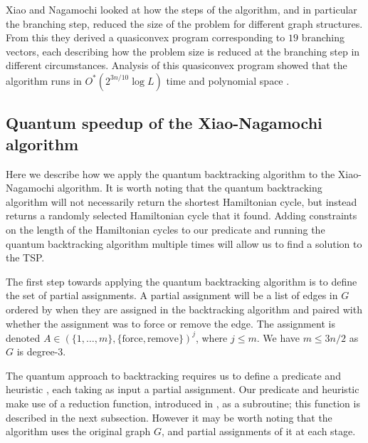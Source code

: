 Xiao and Nagamochi looked at how the steps of the algorithm, and in particular the branching step, reduced the size of the problem for different graph structures. From this they derived a quasiconvex program corresponding to $19$ branching vectors, each describing how the problem size is reduced at the branching step in different circumstances. Analysis of this quasiconvex program showed that the algorithm runs in $O^*(2^{3n/10}\log L)$ time and polynomial space \cite{xiao2016degree3}.

\subsection{Quantum speedup of the Xiao-Nagamochi algorithm}
\label{sec:deg3speedup}

Here we describe how we apply the quantum backtracking algorithm to the Xiao-Nagamochi algorithm. It is worth noting that the quantum backtracking algorithm will not necessarily return the shortest Hamiltonian cycle, but instead returns a randomly selected Hamiltonian cycle that it found. Adding constraints on the length of the Hamiltonian cycles to our predicate and running the quantum backtracking algorithm multiple times will allow us to find a solution to the TSP.

The first step towards applying the quantum backtracking algorithm is to define the set of partial assignments. A partial assignment will be a list of edges in $G$ ordered by when they are assigned in the backtracking algorithm and paired with whether the assignment was to force or remove the edge. The assignment is denoted $A \in (\{1,\dots,m\}, \{\text{force}, \text{remove}\})^j$, where $j \leq m$. We have $m \le 3n/2$ as $G$ is degree-3.


The quantum approach to backtracking requires us to define a predicate \FnPredicatethree and heuristic \FnHeuristicthree, each taking as input a partial assignment. Our predicate and heuristic make use of a reduction function, introduced in \cite{xiao2016degree3}, as a subroutine; this function is described in the next subsection. However it may be worth noting that the algorithm uses the original graph $G$, and partial assignments of it at each stage.

